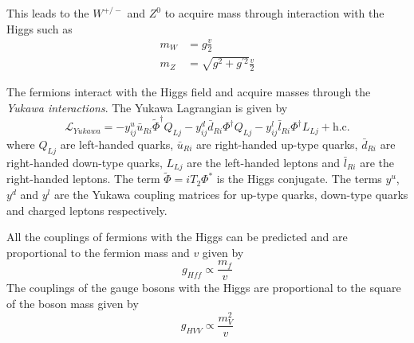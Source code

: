 This leads to the $W^{+/-}$ and $Z^0$ to acquire mass through interaction with the Higgs such as
\begin{equation}
  \begin{aligned}
    m_{W} &= g\frac{v}{2}\\
    m_{Z} &= \sqrt{g^2 + g^{\prime 2}}\frac{v}{2}
  \end{aligned}
\end{equation}

The fermions interact with the Higgs field and acquire masses through the \textit{Yukawa interactions}. The Yukawa Lagrangian is given by \cite{ILC_TDR_Vol2}
\begin{equation}
  \mathcal{L}_{Yukawa} = - y^u_{ij}\bar{u}_{Ri}\widetilde{\Phi}^{\dagger}Q_{Lj} - y^d_{ij}\bar{d}_{Ri}\Phi^{\dagger}Q_{Lj} - y^l_{ij}\bar{l}_{Ri}\Phi^{\dagger}L_{Lj} + \text{h.c}.
\end{equation}
where $Q_{Lj}$ are left-handed quarks, $\bar{u}_{Ri}$ are right-handed up-type quarks, $\bar{d}_{Ri}$ are right-handed down-type quarks, $L_{Lj}$ are the left-handed leptons and $\bar{l}_{Ri}$ are the right-handed leptons. The term $\widetilde{\Phi} = iT_2\Phi^{*}$ is the Higgs conjugate. The terms $y^u$, $y^d$ and $y^l$ are the Yukawa coupling matrices for up-type quarks, down-type quarks and charged leptons respectively.

All the couplings of fermions with the Higgs can be predicted and are proportional to the fermion mass and $v$ given by
\begin{equation}
  g_{Hff} \propto \frac{m_f}{v}
\end{equation}
The couplings of the gauge bosons with the Higgs are proportional to the square of the boson mass given by
\begin{equation}
  g_{HVV} \propto \frac{m_V^2}{v}
\end{equation}


